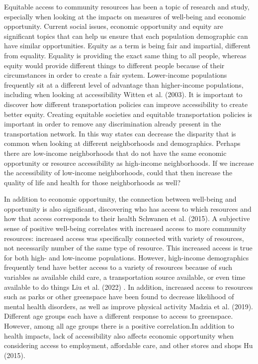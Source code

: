 \documentclass[
  letterpaper,
  authoryear,
  review,
  3p]{elsarticle}
\begin{document}
Equitable access to community resources has been a topic of research and
study, especially when looking at the impacts on measures of well-being
and economic opportunity. Current social issues, economic opportunity
and equity are significant topics that can help us ensure that each
population demographic can have similar opportunities. Equity as a term
is being fair and impartial, different from equality. Equality is
providing the exact same thing to all people, whereas equity would
provide different things to different people because of their
circumstances in order to create a fair system. Lower-income populations
frequently sit at a different level of advantage than higher-income
populations, including when looking at accessibility Witten et al.
(2003). It is important to discover how different transportation
policies can improve accessibility to create better equity. Creating
equitable societies and equitable transportation policies is important
in order to remove any discrimination already present in the
transportation network. In this way states can decrease the disparity
that is common when looking at different neighborhoods and demographics.
Perhaps there are low-income neighborhoods that do not have the same
economic opportunity or resource accessibility as high-income
neighborhoods. If we increase the accessibility of low-income
neighborhoods, could that then increase the quality of life and health
for those neighborhoods as well?

In addition to economic opportunity, the connection between well-being
and opportunity is also significant, discovering who has access to which
resources and how that access corresponds to their health Schwanen et
al. (2015). A subjective sense of positive well-being correlates with
increased access to more community resources: increased access was
specifically connected with variety of resources, not necessarily number
of the same type of resource. This increased access is true for both
high- and low-income populations. However, high-income demographics
frequently tend have better access to a variety of resources because of
such variables as available child care, a transportation source
available, or even time available to do things Liu et al. (2022) . In
addition, increased access to resources such as parks or other
greenspace have been found to decrease likelihood of mental health
disorders, as well as improve physical activity Madzia et al. (2019).
Different age groups each have a different response to access to
greenspace. However, among all age groups there is a positive
correlation.In addition to health impacts, lack of accessibility also
affects economic opportunity when considering access to employment,
affordable care, and other stores and shops Hu (2015).
\end{document}
